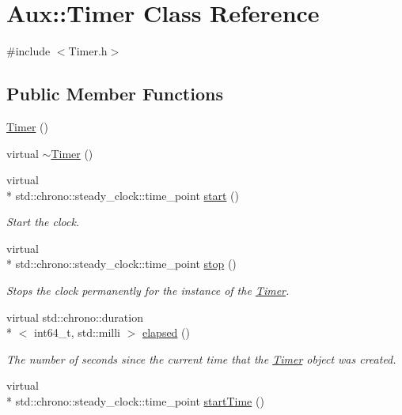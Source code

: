 \hypertarget{class_aux_1_1_timer}{\section{Aux\-:\-:Timer Class Reference}
\label{class_aux_1_1_timer}
}


{\ttfamily \#include $<$Timer.\-h$>$}

\subsection*{Public Member Functions}
\begin{DoxyCompactItemize}
\item 
\hyperlink{class_aux_1_1_timer_a20a52aee280d958a8a2a903ffdc0847e}{Timer} ()
\item 
virtual \hyperlink{class_aux_1_1_timer_ae5467925452fc10618acf8f5c27b46e6}{$\sim$\-Timer} ()
\item 
virtual \\*
std\-::chrono\-::steady\-\_\-clock\-::time\-\_\-point \hyperlink{class_aux_1_1_timer_a3c58e715148a05a6294743619d111bab}{start} ()
\begin{DoxyCompactList}\small\item\em Start the clock. \end{DoxyCompactList}\item 
virtual \\*
std\-::chrono\-::steady\-\_\-clock\-::time\-\_\-point \hyperlink{class_aux_1_1_timer_a14d926626eef461e836f87f7bc3d03b7}{stop} ()
\begin{DoxyCompactList}\small\item\em Stops the clock permanently for the instance of the \hyperlink{class_aux_1_1_timer}{Timer}. \end{DoxyCompactList}\item 
virtual std\-::chrono\-::duration\\*
$<$ int64\-\_\-t, std\-::milli $>$ \hyperlink{class_aux_1_1_timer_a16fdb76113530c5d4d8787e27d1e0aca}{elapsed} ()
\begin{DoxyCompactList}\small\item\em The number of seconds since the current time that the \hyperlink{class_aux_1_1_timer}{Timer} object was created. \end{DoxyCompactList}\item 
virtual \\*
std\-::chrono\-::steady\-\_\-clock\-::time\-\_\-point \hyperlink{class_aux_1_1_timer_a767c6de21191f9bee75c35edd9df2c9e}{start\-Time} ()

\end{DoxyCompactItemize}
